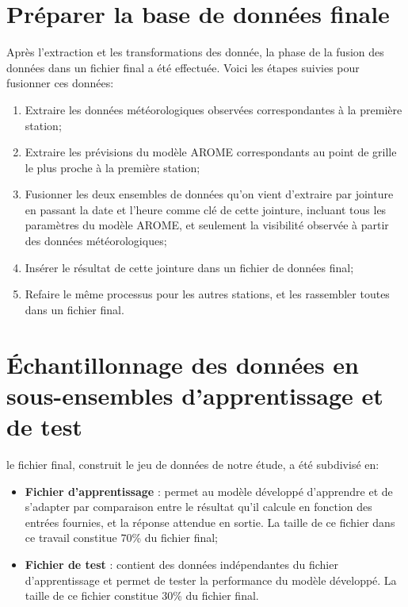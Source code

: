 \section{Préparer la base de données finale}
Après l'extraction et les transformations des donnée, la phase de la fusion des données dans un fichier final a été effectuée. Voici les étapes suivies pour fusionner ces données: 
\begin{enumerate}
    \item Extraire les données météorologiques observées correspondantes à la première station;
    \item Extraire les prévisions du modèle AROME correspondants au point de grille le plus proche à la
première station;
    \item Fusionner les deux ensembles de données qu’on vient d’extraire par jointure en passant la date
et l’heure comme clé de cette jointure, incluant tous les paramètres du modèle AROME, et
seulement la visibilité observée à partir des données météorologiques;
    \item Insérer le résultat de cette jointure dans un fichier de données final;
    \item Refaire le même processus pour les autres stations, et les rassembler toutes dans un fichier final.
\end{enumerate}
\section{Échantillonnage des données en sous-ensembles d'apprentissage et de test}
le fichier final, construit le jeu de données de notre étude, a été subdivisé en:\\

\begin{itemize}
    \item[\ding{230}] \textbf{Fichier d’apprentissage} : permet au modèle développé d’apprendre et de s’adapter par comparaison entre le résultat qu’il calcule en fonction des entrées fournies, et la réponse attendue en sortie. La taille de ce fichier dans ce travail constitue 70\% du fichier final;\\
    
    \item[\ding{230}] \textbf{Fichier de test} : contient des données indépendantes du fichier d’apprentissage et permet de tester la performance du modèle développé. La taille de ce fichier constitue 30\% du fichier final.\\
\end{itemize}

